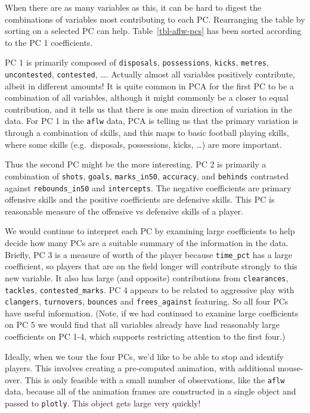 \documentclass[
  letterpaper,
]{krantz}
\begin{document}
When there are as many variables as this, it can be hard to digest the
combinations of variables most contributing to each PC. Rearranging the
table by sorting on a selected PC can help. Table~\ref{tbl-aflw-pcs} has
been sorted according to the PC 1 coefficients.

PC 1 is primarily composed of \texttt{disposals}, \texttt{possessions},
\texttt{kicks}, \texttt{metres}, \texttt{uncontested},
\texttt{contested}, \ldots. Actually almost all variables positively
contribute, albeit in different amounts! It is quite common in PCA for
the first PC to be a combination of all variables, although it might
commonly be a closer to equal contribution, and it tells us that there
is one main direction of variation in the data. For PC 1 in the
\texttt{aflw} data, PCA is telling us that the primary variation is
through a combination of skills, and this maps to basic football playing
skills, where some skills (e.g.~disposals, possessions, kicks, \ldots)
are more important.

Thus the second PC might be the more interesting. PC 2 is primarily a
combination of \texttt{shots}, \texttt{goals}, \texttt{marks\_in50},
\texttt{accuracy}, and \texttt{behinds} contrasted against
\texttt{rebounds\_in50} and \texttt{intercepts}. The negative
coefficients are primary offensive skills and the positive coefficients
are defensive skills. This PC is reasonable measure of the offensive vs
defensive skills of a player.

We would continue to interpret each PC by examining large coefficients
to help decide how many PCs are a suitable summary of the information in
the data. Briefly, PC 3 is a measure of worth of the player because
\texttt{time\_pct} has a large coefficient, so players that are on the
field longer will contribute strongly to this new variable. It also has
large (and opposite) contributions from \texttt{clearances},
\texttt{tackles}, \texttt{contested\_marks}. PC 4 appears to be related
to aggressive play with \texttt{clangers}, \texttt{turnovers},
\texttt{bounces} and \texttt{frees\_against} featuring. So all four PCs
have useful information. (Note, if we had continued to examine large
coefficients on PC 5 we would find that all variables already have had
reasonably large coefficients on PC 1-4, which supports restricting
attention to the first four.)

Ideally, when we tour the four PCs, we'd like to be able to stop and
identify players. This involves creating a pre-computed animation, with
additional mouse-over. This is only feasible with a small number of
observations, like the \texttt{aflw} data, because all of the animation
frames are constructed in a single object and passed to \texttt{plotly}.
This object gets large very quickly!
\end{document}

